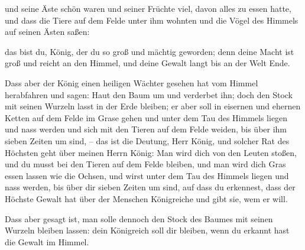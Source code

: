  und seine Äste schön waren und seiner Früchte viel,
davon alles zu essen hatte, und dass die Tiere auf dem Felde unter ihm
wohnten und die Vögel des Himmels auf seinen Ästen saßen:

 das bist du, König, der du so groß und mächtig geworden;
denn deine Macht ist groß und reicht an den Himmel, und deine Gewalt
langt bis an der Welt Ende.

 Dass aber der König einen heiligen Wächter gesehen hat
vom Himmel herabfahren und sagen: Haut den Baum um und verderbet ihn;
doch den Stock mit seinen Wurzeln lasst in der Erde bleiben; er aber
soll in eisernen und ehernen Ketten auf dem Felde im Grase gehen und
unter dem Tau des Himmels liegen und nass werden und sich mit den Tieren
auf dem Felde weiden, bis über ihm sieben Zeiten um sind, --
 das ist die Deutung, Herr König, und solcher Rat des
Höchsten geht über meinen Herrn König:  Man wird dich von
den Leuten stoßen, und du musst bei den Tieren auf dem Felde bleiben,
und man wird dich Gras essen lassen wie die Ochsen, und wirst unter dem
Tau des Himmels liegen und nass werden, bis über dir sieben Zeiten um
sind, auf dass du erkennest, dass der Höchste Gewalt hat über der
Menschen Königreiche und gibt sie, wem er will.

 Dass aber gesagt ist, man solle dennoch den Stock des
Baumes mit seinen Wurzeln bleiben lassen: dein Königreich soll dir
bleiben, wenn du erkannt hast die Gewalt im Himmel.

